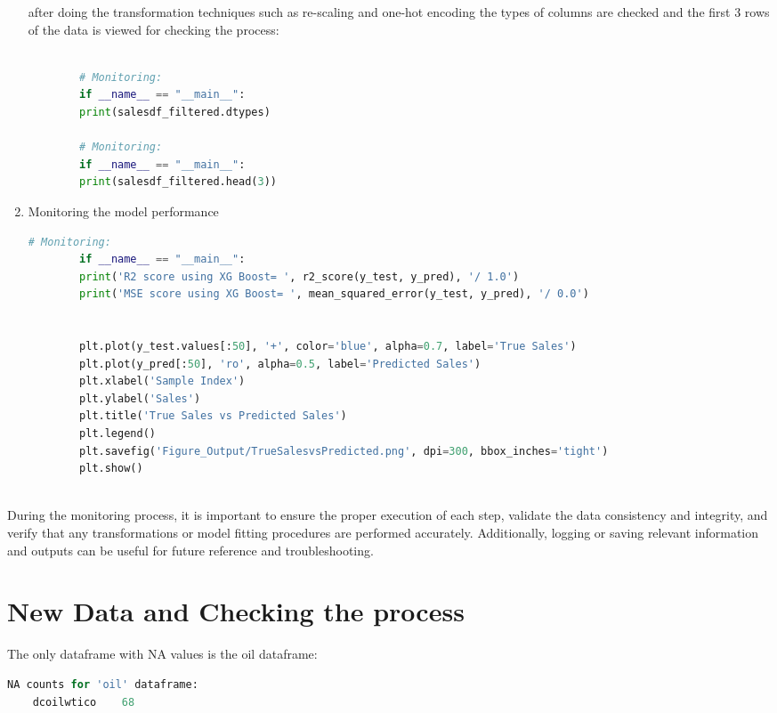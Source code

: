 \begin{enumerate}
	
	
	after doing the transformation techniques such as re-scaling and one-hot encoding the types of columns are checked and the first 3 rows of the data is viewed for checking the process:
	
	\begin{lstlisting}[language=Python]
		
		# Monitoring:
		if __name__ == "__main__":
		print(salesdf_filtered.dtypes)
		
		# Monitoring:
		if __name__ == "__main__":
		print(salesdf_filtered.head(3))
	\end{lstlisting}
	
	\item Monitoring the model performance
	
	\begin{lstlisting}[language=Python]
		# Monitoring:
		if __name__ == "__main__":
		print('R2 score using XG Boost= ', r2_score(y_test, y_pred), '/ 1.0')
		print('MSE score using XG Boost= ', mean_squared_error(y_test, y_pred), '/ 0.0')
		
		
		plt.plot(y_test.values[:50], '+', color='blue', alpha=0.7, label='True Sales')
		plt.plot(y_pred[:50], 'ro', alpha=0.5, label='Predicted Sales')
		plt.xlabel('Sample Index')
		plt.ylabel('Sales')
		plt.title('True Sales vs Predicted Sales')
		plt.legend()
		plt.savefig('Figure_Output/TrueSalesvsPredicted.png', dpi=300, bbox_inches='tight')
		plt.show()
		
	\end{lstlisting}
	
\end{enumerate}

During the monitoring process, it is important to ensure the proper execution of each step, validate the data consistency and integrity, and verify that any transformations or model fitting procedures are performed accurately. Additionally, logging or saving relevant information and outputs can be useful for future reference and troubleshooting.



\section{New Data and Checking the process}

The only dataframe with NA values is the oil dataframe:

\begin{lstlisting}[language=Python]
	NA counts for 'oil' dataframe:
	dcoilwtico    68
\end{lstlisting}

